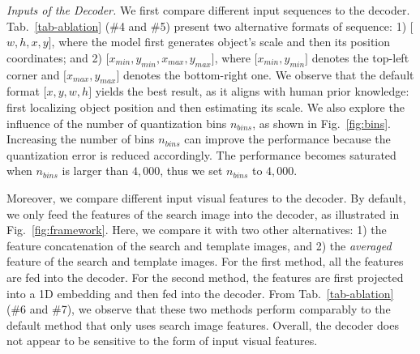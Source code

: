 \begin{table}[t]\normalsize
\centering
  \caption{Ablation study of the number of decoder blocks. Avg. denotes the performance averaged over benchmarks. The baseline setting is marked in \colorbox{gray!15}{gray}.}
  \label{tab-ablation_block}
    \vspace{-3mm}
  \vspace{-3mm}
\end{table}

\textit{Inputs of the Decoder.} 
We first compare different input sequences to the decoder. Tab.~\ref{tab-ablation} (\#4 and \#5) present two alternative formats of sequence:
1) $[$$w, $$h, $$x, $$y]$, where the model first generates object's scale and then its position coordinates;
and 2) $[x_{min}, $$y_{min}, $$x_{max}, $$y_{max}]$, where $[x_{min},$$y_{min}]$ denotes the top-left corner and $[x_{max},$$y_{max}]$ denotes the bottom-right one.
We observe that the default format $[x,$$y,$$w,$$h]$ yields the best result, as it aligns with human prior knowledge: first localizing object position and then estimating its scale.
We also explore the influence of the number of quantization bins $n_{bins}$, as shown in Fig.~\ref{fig:bins}. Increasing the number of bins $n_{bins}$ can improve the performance because the quantization error is reduced accordingly. The performance becomes saturated when $n_{bins}$ is larger than $4,000$, thus we set $n_{bins}$ to $4,000$.

Moreover, we compare different input visual features to the decoder. By default, we only feed the features of the search image into the decoder, as illustrated in Fig.~\ref{fig:framework}. Here, we compare it with two other alternatives: 1) the feature concatenation of the search and template images, and 2) the \emph{averaged} feature of the search and template images. For the first method, all the features are fed into the decoder. For the second method, the features are first projected into a 1D embedding and then fed into the decoder. From Tab.~\ref{tab-ablation} (\#6 and \#7), we observe that these two methods perform comparably to the default method that only uses search image features. Overall, the decoder does not appear to be sensitive to the form of input visual features.

